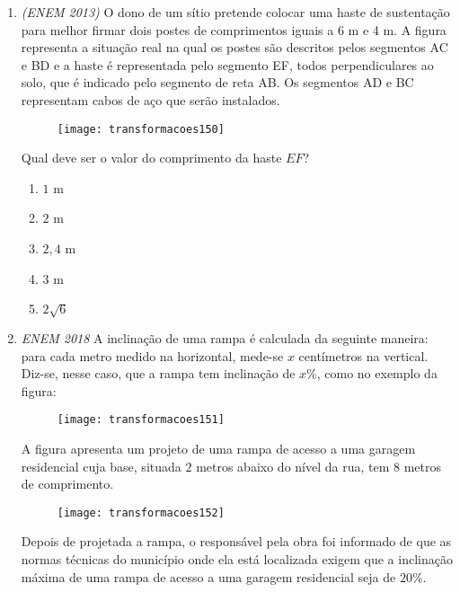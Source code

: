 \begin{enumerate}
\item \textit{(ENEM 2013)} O dono de um sítio pretende colocar uma haste de sustentação para melhor firmar dois postes de comprimentos iguais a 6 m e 4 m. A figura representa a situação real na qual os postes são descritos pelos segmentos AC e BD e a haste é representada pelo segmento EF, todos perpendiculares ao solo, que é indicado pelo segmento de reta AB. Os segmentos AD e BC representam cabos de aço que serão instalados. 

\begin{figure}[H]
\centering

\texttt{[image: transformacoes150]}
\end{figure}

Qual deve ser o valor do comprimento da haste $EF$?

\begin{enumerate}
\item $1$ m
\item $2$ m
\item $2{,}4$ m
\item $3$ m
\item $2\sqrt{6}$
\end{enumerate}


\item \textit{ENEM 2018} A inclinação de uma rampa é calculada da seguinte maneira: para cada metro medido na horizontal, mede-se $x$ centímetros na vertical. Diz-se, nesse caso, que a rampa tem inclinação de $x\%$, como no exemplo da figura:

\begin{figure}[H]
\centering

\texttt{[image: transformacoes151]}
\end{figure}

A figura apresenta um projeto de uma rampa de acesso a uma garagem residencial cuja base, situada $2$ metros abaixo do nível da rua, tem $8$ metros de comprimento.

\begin{figure}[H]
\centering

\texttt{[image: transformacoes152]}
\end{figure}

Depois de projetada a rampa, o responsável pela obra foi informado de que as normas técnicas do município onde ela está localizada exigem que a inclinação máxima de uma rampa de acesso a uma garagem residencial seja de $20\%$. 


\end{enumerate}
